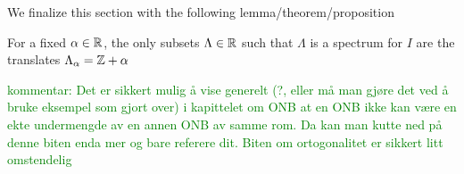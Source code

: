 \documentclass[../thesis.tex]{subfiles}
\begin{document}
We finalize this section with the following lemma/theorem/proposition
\begin{lemma}
    For a fixed $\alpha \in \mathbb{R}$, the only subsets $\Lambda \in \mathbb{R}$ such that $\Lambda$ is a spectrum for $I$ are the translates $\Lambda_\alpha = \mathbb{Z} + \alpha$
\end{lemma}

\textcolor{green}{kommentar: Det er sikkert mulig å vise generelt (?, eller må man gjøre det ved å bruke eksempel som gjort over) i kapittelet om ONB at en ONB ikke kan være en ekte undermengde av en annen ONB av samme rom. Da kan man kutte ned på denne biten enda mer og bare referere dit. Biten om ortogonalitet er sikkert litt omstendelig}
\end{document}
